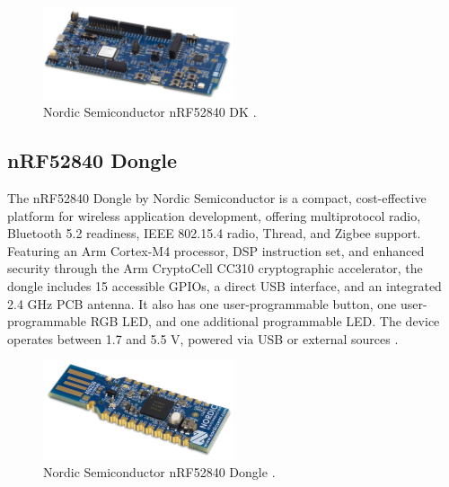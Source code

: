 \begin{figure}[!htb]
    \centering
    \includegraphics[width=0.5\textwidth]{images/situational_theoretical_analysis/nRF52840_DK.png}
    \caption{Nordic Semiconductor nRF52840 DK \cite{Semiconductor_Nordic_Product_Brief_2018_2.0}.}
    \label{fig:nRF52840_DK}
\end{figure}

\subsection{nRF52840 Dongle}
The nRF52840 Dongle by Nordic Semiconductor is a compact, cost-effective platform for wireless application development, offering multiprotocol radio, Bluetooth 5.2 readiness, IEEE 802.15.4 radio, Thread, and Zigbee support. Featuring an Arm Cortex-M4 processor, DSP instruction set, and enhanced security through the Arm CryptoCell CC310 cryptographic accelerator, the dongle includes 15 accessible GPIOs, a direct USB interface, and an integrated 2.4 GHz PCB antenna. It also has one user-programmable button, one user-programmable RGB LED, and one additional programmable LED. The device operates between 1.7 and 5.5 V, powered via USB or external sources \cite{Semiconductor_Nordic_Dongle_Brief_2018_2.0}.

\begin{figure}[!htb]
    \centering
    \includegraphics[width=0.5\textwidth]{images/situational_theoretical_analysis/nRF52840_Dongle.png}
    \caption{Nordic Semiconductor nRF52840 Dongle \cite{Semiconductor_Nordic_Dongle_Brief_2018_2.0}.}
    \label{fig:nRF52840_Dongle}
\end{figure}

